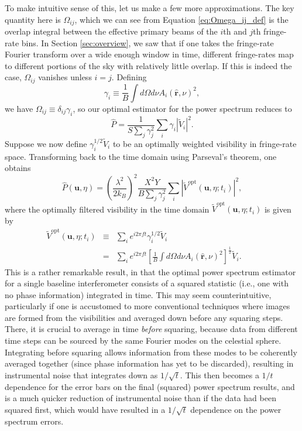 \documentclass[twocolumn,apj,numberedappendix]{emulateapj}
\newcommand{\rhat}{\hat{\mathbf{r}}}
\begin{document}
To make intuitive sense of this, let us make a few more approximations. The key quantity here is $\Omega_{ij}$, which we can see from Equation \eqref{eq:Omega_ij_def} is the overlap integral between the effective primary beams of the $i$th and $j$th fringe-rate bins. In Section \ref{sec:overview}, we saw that if one takes the fringe-rate Fourier transform over a wide enough window in time, different fringe-rates map to different portions of the sky with relatively little overlap. If this is indeed the case, $\Omega_{ij}$ vanishes unless $i=j$. Defining
\begin{equation}
\gamma_i  \equiv \frac{1}{B} \int d\Omega d\nu A_i(\rhat,\nu)^2,
\end{equation}
we have $\Omega_{ij} \equiv \delta_{ij} \gamma_i$, so our optimal estimator for the power spectrum reduces to
\begin{equation}
\widehat{P} = \frac{1}{S \sum_j \gamma_j^2}\sum_i \gamma_i | \widetilde{V}_i |^2 .
\end{equation}
Suppose we now define $\gamma_i^{1/2} \widetilde{V}_i$ to be an optimally weighted visibility in fringe-rate space. Transforming back to the time domain using Parseval's theorem, one obtains
\begin{equation}
\label{eq:finalEst}
\widehat{P}(\mathbf{u}, \eta) = \left( \frac{\lambda^2}{2 k_B} \right)^2 \frac{X^2 Y}{B\sum_j \gamma_j^2} \sum_i |\widetilde{V}^\textrm{opt} (\mathbf{u}, \eta; t_i)|^2,
\end{equation}
where the optimally filtered visibility in the time domain $\widetilde{V}^\textrm{opt} (\mathbf{u}, \eta; t_i)$ is given by
\begin{eqnarray}
\widetilde{V}^\textrm{opt} (\mathbf{u}, \eta; t_i) &\equiv& \sum_i e^{i 2 \pi f t} \gamma_i^{1/2} \widetilde{V}_i \nonumber \\
&=&  \sum_i e^{i 2 \pi f t} \left[\frac{1}{B} \int d\Omega d\nu A_i(\rhat,\nu)^2\right]^\frac{1}{2} \widetilde{V}_i. \qquad
\end{eqnarray}
This is a rather remarkable result, in that the optimal power spectrum estimator for a single baseline interferometer consists of a squared statistic (i.e., one with no phase information) integrated in time. This may seem counterintuitive, particularly if one is accustomed to more conventional techniques where images are formed from the visibilities and averaged down before any squaring steps. There, it is crucial to average in time \emph{before} squaring, because data from different time steps can be sourced by the same Fourier modes on the celestial sphere. Integrating before squaring allows information from these modes to be coherently averaged together (since phase information has yet to be discarded), resulting in instrumental noise that integrates down as $1/\sqrt{t}$. This then becomes a $1/t$ dependence for the error bars on the final (squared) power spectrum results, and is a much quicker reduction of instrumental noise than if the data had been squared first, which would have resulted in a $1/\sqrt{t}$ dependence on the power spectrum errors.
\end{document}
